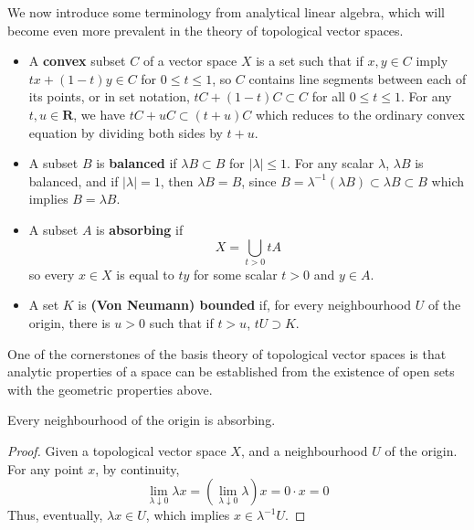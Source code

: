 We now introduce some terminology from analytical linear algebra, which will become even more prevalent in the theory of topological vector spaces.
%
\begin{itemize}
    \item A {\bf convex} subset $C$ of a vector space $X$ is a set such that if $x, y \in C$ imply $tx + (1 - t) y \in C$ for $0 \leq t \leq 1$, so $C$ contains line segments between each of its points, or in set notation, $tC + (1 - t)C \subset C$ for all $0 \leq t \leq 1$. For any $t, u \in \mathbf{R}$, we have $tC + uC \subset (t + u) C$ which reduces to the ordinary convex equation by dividing both sides by $t + u$.

    \item A subset $B$ is {\bf balanced} if $\lambda B \subset B$ for $|\lambda| \leq 1$. For any scalar $\lambda$, $\lambda B$ is balanced, and if $|\lambda| = 1$, then $\lambda B = B$, since $B = \lambda^{-1}(\lambda B) \subset \lambda B \subset B$
    which implies $B = \lambda B$.

    \item A subset $A$ is {\bf absorbing} if
    \[ X = \bigcup_{t > 0} tA \]
    so every $x \in X$ is equal to $ty$ for some scalar $t > 0$ and $y \in A$.

    \item A set $K$ is {\bf (Von Neumann) bounded} if, for every neighbourhood $U$ of the origin, there is $u > 0$ such that if $t > u$, $tU \supset K$.

\end{itemize}
%
One of the cornerstones of the basis theory of topological vector spaces is that analytic properties of a space can be established from the existence of open sets with the geometric properties above.

\begin{theorem}
    Every neighbourhood of the origin is absorbing.
\end{theorem}
\begin{proof}
    Given a topological vector space $X$, and a neighbourhood $U$ of the origin. For any point $x$, by continuity,
    \[ \lim_{\lambda \downarrow 0} \lambda x = \left( \lim_{\lambda \downarrow 0} \lambda \right) x = 0 \cdot x = 0 \]
    Thus, eventually, $\lambda x \in U$, which implies $x \in \lambda^{-1} U$.
\end{proof}

